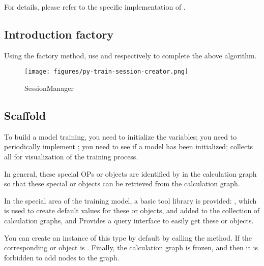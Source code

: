 \begin{content}
\begin{enum}
\end{enum}

For details, please refer to the specific implementation of .


\subsection{Introduction factory}
Using the factory method, use  and  respectively to complete the above algorithm.

\begin{figure}[!htbp]
  \centering
  \texttt{[image: figures/py-train-session-creator.png]}
  \caption{SessionManager}
  \label{fig:py-train-session-creator}
\end{figure}


\subsection{Scaffold}
To build a model training, you need  to initialize the variables; you need  to periodically implement ; you need  to see if a model has been initialized;  collects all  for visualization of the training process.

In general, these special OPs or objects are identified by  in the calculation graph so that these special  or objects can be retrieved from the calculation graph.

In the special area of ​​the training model, a basic tool library is provided: , which is used to create default values ​​for these  or objects, and added to the collection of calculation graphs, and  Provides a query interface to easily get these  or objects.

You can create an instance of this type by default by calling the  method. If the corresponding  or object is . Finally, the calculation graph is frozen, and then it is forbidden to add nodes to the graph.


\end{content}
